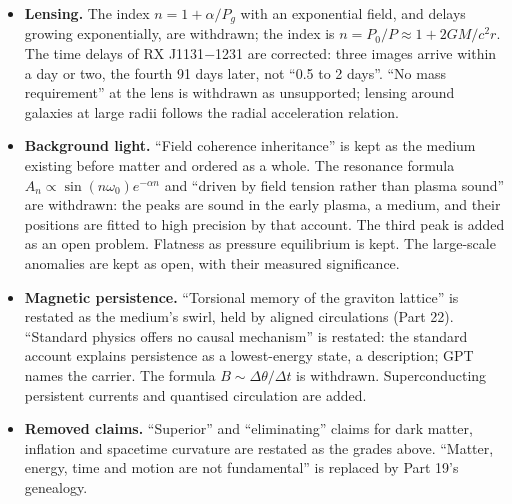 \documentclass[11pt,a4paper]{article}
\begin{document}
\begin{itemize}
\item \textbf{Lensing.} The index $n = 1+\alpha/P_g$ with an exponential field, and delays growing exponentially, are withdrawn; the index is $n = P_0/P \approx 1+2GM/c^2r$. The time delays of RX J1131$-$1231 are corrected: three images arrive within a day or two, the fourth 91 days later, not ``0.5 to 2 days''. ``No mass requirement'' at the lens is withdrawn as unsupported; lensing around galaxies at large radii follows the radial acceleration relation.
\item \textbf{Background light.} ``Field coherence inheritance'' is kept as the medium existing before matter and ordered as a whole. The resonance formula $A_n \propto \sin(n\omega_0)e^{-\alpha n}$ and ``driven by field tension rather than plasma sound'' are withdrawn: the peaks are sound in the early plasma, a medium, and their positions are fitted to high precision by that account. The third peak is added as an open problem. Flatness as pressure equilibrium is kept. The large-scale anomalies are kept as open, with their measured significance.
\item \textbf{Magnetic persistence.} ``Torsional memory of the graviton lattice'' is restated as the medium's swirl, held by aligned circulations (Part 22). ``Standard physics offers no causal mechanism'' is restated: the standard account explains persistence as a lowest-energy state, a description; GPT names the carrier. The formula $B \sim \Delta\theta/\Delta t$ is withdrawn. Superconducting persistent currents and quantised circulation are added.
\item \textbf{Removed claims.} ``Superior'' and ``eliminating'' claims for dark matter, inflation and spacetime curvature are restated as the grades above. ``Matter, energy, time and motion are not fundamental'' is replaced by Part 19's genealogy.
\end{itemize}
\end{document}
